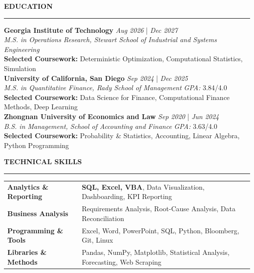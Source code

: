 \documentclass{../original_CV/resume}
\renewcommand{\sectionskip}{\vspace{0.10cm}}
\renewcommand{\sectionlineskip}{\vspace{0.10cm}}
\renewenvironment{rSection}[1]{
\sectionskip
\textcolor{UC San Diego Blue}{\textbf{\large\bfseries\MakeUppercase{#1}}}
\sectionlineskip
\hrule
\begin{list}{}{
\setlength{\leftmargin}{0em}
}
\item[]
}{
\end{list}
}
\begin{document}
\thispagestyle{empty}

\begin{rSection}{EDUCATION}
{\bf Georgia Institute of Technology} \hfill {\em Aug 2026} | {\em Dec 2027}
\\ \textit{M.S. in Operations Research, Stewart School of Industrial and Systems Engineering} \\
\textbf{Selected Coursework:} Deterministic Optimization, Computational Statistics, Simulation \\
{\bf University of California, San Diego} \hfill {\em Sep 2024} | {\em Dec 2025}
\\ \textit{M.S. in Quantitative Finance, Rady School of Management} \hfill \textit{GPA:} 3.84/4.0 \\
\textbf{Selected Coursework:} Data Science for Finance, Computational Finance Methods, Deep Learning \\
{\bf Zhongnan University of Economics and Law} \hfill {\em Sep 2020} | {\em Jun 2024}
\\ \textit{B.S. in Management, School of Accounting and Finance} \hfill \textit{GPA:} 3.63/4.0 \\
\textbf{Selected Coursework:} Probability \& Statistics, Accounting, Linear Algebra, Python Programming
\end{rSection}

\begin{rSection}{TECHNICAL SKILLS} \itemsep -2pt
\begin{tabularx}{\textwidth}{@{} >{\bfseries}l >{\raggedleft\arraybackslash}X @{}}
Analytics \& Reporting & \textbf{SQL, Excel, VBA}, Data Visualization, Dashboarding, KPI Reporting \\
Business Analysis & Requirements Analysis, Root-Cause Analysis, Data Reconciliation \\
Programming \& Tools & Excel, Word, PowerPoint, SQL, Python, Bloomberg, Git, Linux \\
Libraries \& Methods & Pandas, NumPy, Matplotlib, Statistical Analysis, Forecasting, Web Scraping \\
\end{tabularx}
\end{rSection}
\end{document}

